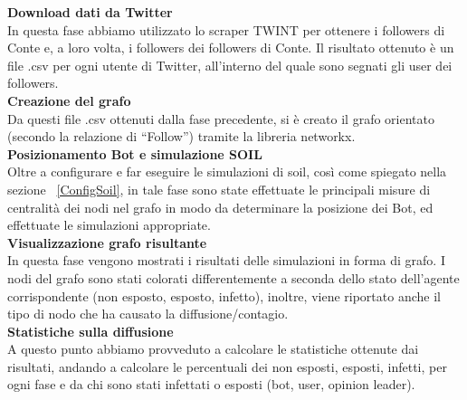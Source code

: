          \textbf{Download dati da Twitter}
          \\
          In questa fase abbiamo utilizzato lo scraper TWINT per ottenere i followers di Conte e, a loro volta, i followers dei followers di Conte. Il risultato ottenuto è un file .csv per ogni utente di Twitter, all'interno del quale sono segnati gli user dei followers.
          \\
          \textbf{Creazione del grafo}
          \\
          Da questi file .csv ottenuti dalla fase precedente, si è creato il grafo orientato (secondo la relazione di “Follow”) tramite la libreria networkx.
          \\
          \textbf{Posizionamento Bot e simulazione SOIL}
          \\
          Oltre a configurare e far eseguire le simulazioni di soil, così come spiegato nella sezione ~\ref{ConfigSoil}, in tale fase sono state effettuate le principali misure di centralità dei nodi nel grafo in modo da determinare la posizione dei Bot, ed effettuate le simulazioni appropriate.
          \\
          \textbf{Visualizzazione grafo risultante}
          \\
          In questa fase vengono mostrati i risultati delle simulazioni in forma di grafo. I nodi del grafo sono stati colorati differentemente a seconda dello stato dell’agente corrispondente (non esposto, esposto, infetto), inoltre, viene riportato anche il tipo di nodo che ha causato la diffusione/contagio.
          \\
          \textbf{Statistiche sulla diffusione}
          \\
          A questo punto abbiamo provveduto a calcolare le statistiche ottenute dai risultati, andando a calcolare le percentuali dei non esposti, esposti, infetti, per ogni fase e da chi sono stati infettati o esposti (bot, user, opinion leader).

